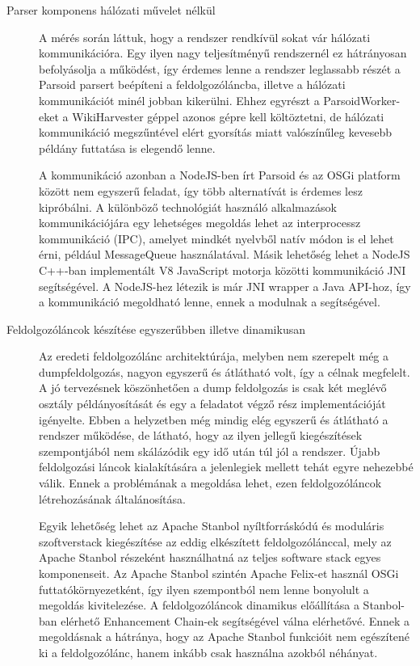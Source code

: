 \begin{description}
	\item[Parser komponens hálózati művelet nélkül] A mérés során láttuk, hogy a rendszer rendkívül sokat vár hálózati kommunikációra. Egy ilyen nagy teljesítményű rendszernél ez hátrányosan befolyásolja a működést, így érdemes lenne a rendszer leglassabb részét a Parsoid parsert beépíteni a feldolgozóláncba, illetve a hálózati kommunikációt minél jobban kikerülni. Ehhez egyrészt a ParsoidWorker-eket a WikiHarvester géppel azonos gépre kell költöztetni, de hálózati kommunikáció megszűntével elért gyorsítás miatt valószínűleg kevesebb példány futtatása is elegendő lenne.

A kommunikáció azonban a NodeJS-ben írt Parsoid és az OSGi platform között nem egyszerű feladat, így több alternatívát is érdemes lesz kipróbálni. A különböző technológiát használó alkalmazások kommunikációjára egy lehetséges megoldás lehet az interprocessz kommunikáció (IPC), amelyet mindkét nyelvből natív módon is el lehet érni, például MessageQueue használatával. Másik lehetőség lehet a NodeJS C++-ban implementált V8 JavaScript motorja közötti kommunikáció JNI segítségével. A NodeJS-hez létezik is már JNI wrapper a Java API-hoz, így a kommunikáció megoldható lenne, ennek a modulnak a segítségével.

    \item[Feldolgozóláncok készítése egyszerűbben illetve dinamikusan] Az eredeti feldolgozólánc architektúrája, melyben nem szerepelt még a dumpfeldolgozás, nagyon egyszerű és átlátható volt, így a célnak megfelelt. A jó tervezésnek köszönhetően a dump feldolgozás is csak két meglévő osztály példányosítását és egy a feladatot végző rész implementációját igényelte. Ebben a helyzetben még mindig elég egyszerű és átlátható a rendszer működése, de látható, hogy az ilyen jellegű kiegészítések szempontjából nem skálázódik egy idő után túl jól a rendszer. Újabb feldolgozási láncok kialakítására a jelenlegiek mellett tehát egyre nehezebbé válik. Ennek a problémának a megoldása lehet, ezen feldolgozóláncok létrehozásának általánosítása.
    
Egyik lehetőség lehet az Apache Stanbol nyíltforráskódú és moduláris szoftverstack kiegészítése az eddig elkészített feldolgozólánccal, mely az Apache Stanbol részeként használhatná az teljes software stack egyes komponenseit. Az Apache Stanbol szintén Apache Felix-et használ OSGi futtatókörnyezetként, így ilyen szempontból nem lenne bonyolult a megoldás kivitelezése. A feldolgozóláncok dinamikus előállítása a Stanbol-ban elérhető Enhancement Chain-ek segítségével válna elérhetővé. Ennek a megoldásnak a hátránya, hogy az Apache Stanbol funkcióit nem egészítené ki a feldolgozólánc, hanem inkább csak használna azokból néhányat.
    

\end{description}
